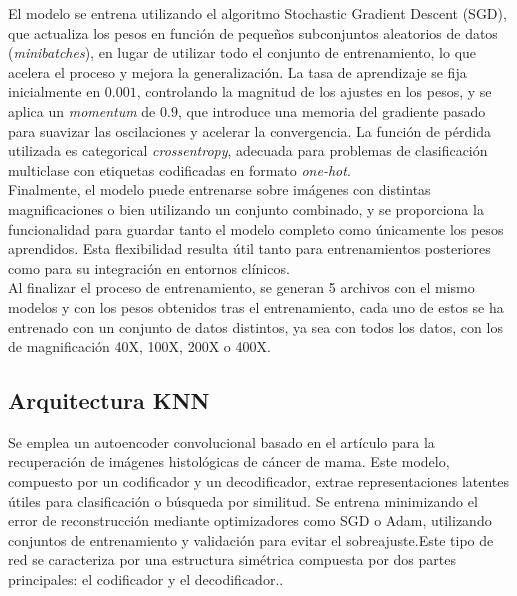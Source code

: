 \documentclass[12pt]{article} %
\begin{document}
El modelo se entrena utilizando el algoritmo Stochastic Gradient Descent (SGD), que actualiza los pesos en función de pequeños subconjuntos aleatorios de datos (\textit{minibatches}), en lugar de utilizar todo el conjunto de entrenamiento, lo que acelera el proceso y mejora la generalización. La tasa de aprendizaje se fija inicialmente en $0.001$, controlando la magnitud de los ajustes en los pesos, y se aplica un \textit{momentum} de $0.9$, que introduce una memoria del gradiente pasado para suavizar las oscilaciones y acelerar la convergencia. La función de pérdida utilizada es categorical \textit{crossentropy}, adecuada para problemas de clasificación multiclase con etiquetas codificadas en formato \textit{one-hot}.\\

Finalmente, el modelo puede entrenarse sobre imágenes con distintas magnificaciones o bien utilizando un conjunto combinado, y se proporciona la funcionalidad para guardar tanto el modelo completo como únicamente los pesos aprendidos. Esta flexibilidad resulta útil tanto para entrenamientos posteriores como para su integración en entornos clínicos.\\

Al finalizar el proceso de entrenamiento, se generan 5 archivos con el mismo modelos y con los pesos obtenidos tras el entrenamiento, cada uno de estos se ha entrenado con un conjunto de datos distintos, ya sea con todos los datos, con los de magnificación 40X, 100X, 200X o 400X. 

\subsection{Arquitectura KNN}
Se emplea un autoencoder convolucional basado en el artículo \cite{minarno2021cnn} para la recuperación de imágenes histológicas de cáncer de mama. Este modelo, compuesto por un codificador y un decodificador, extrae representaciones latentes útiles para clasificación o búsqueda por similitud. Se entrena minimizando el error de reconstrucción mediante optimizadores como SGD o Adam, utilizando conjuntos de entrenamiento y validación para evitar el sobreajuste.Este tipo de red se caracteriza por una estructura simétrica compuesta por dos partes principales: el codificador y el decodificador.. \\
\end{document}
